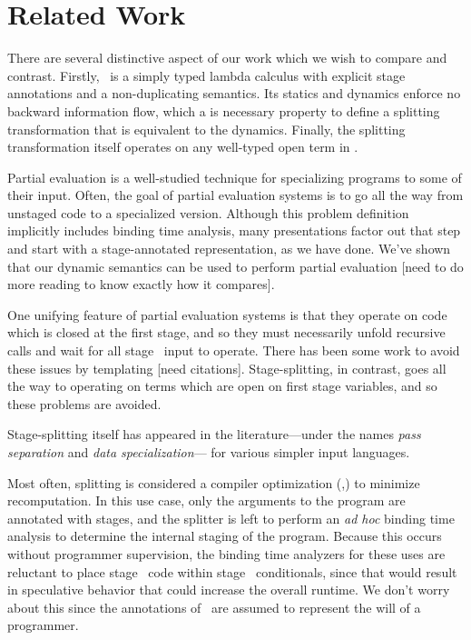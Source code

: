 
\section{Related Work}
There are several distinctive aspect of our work which we wish to compare and contrast.
Firstly, \lang\ is a simply typed lambda calculus 
with explicit stage annotations and a non-duplicating semantics.
Its statics and dynamics enforce no backward information flow,
which a is necessary property to define a splitting transformation
that is equivalent to the dynamics.
Finally, the splitting transformation itself operates on any well-typed open term in \lang.

Partial evaluation is a well-studied technique for specializing programs to some of their input.  
Often, the goal of partial evaluation systems is to go all the way from unstaged code to a specialized version.
Although this problem definition implicitly includes binding time analysis,
many presentations factor out that step and start with a stage-annotated representation, as we have done.
We've shown that our dynamic semantics can be used to perform partial evaluation 
[need to do more reading to know exactly how it compares].

One unifying feature of partial evaluation systems is that they operate on code which is closed at the first stage,
and so they must necessarily unfold recursive calls and wait for all stage \bbone\ input to operate.
There has been some work to avoid these issues by templating [need citations].
Stage-splitting, in contrast, goes all the way to operating on terms which are open on first stage variables,
and so these problems are avoided.


Stage-splitting itself has appeared in the literature---under 
the names {\em pass separation} and {\em data specialization}--- for various simpler input languages.

Most often, splitting is considered a compiler optimization (\cite{jorring86},\cite{knoblock96})
to minimize recomputation.
In this use case, only the arguments to the program are annotated with stages, 
and the splitter is left to perform an {\em ad hoc} binding time analysis to determine the 
internal staging of the program.
Because this occurs without programmer supervision, the binding time analyzers for these uses are 
reluctant to place stage \bbone\ code within stage \bbtwo\ conditionals, 
since that would result in speculative behavior that could increase the overall runtime.
We don't worry about this since the annotations of \lang\ are assumed to represent the will of a programmer.

